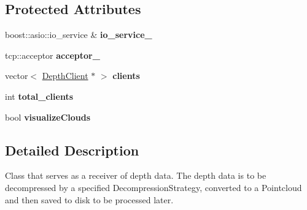 \subsection*{Protected Attributes}
\begin{DoxyCompactItemize}
\item 
\hypertarget{class_depth_server_a8f00b5c9c633649786f2fc2929856b63}{boost\+::asio\+::io\+\_\+service \& {\bfseries io\+\_\+service\+\_\+}}\label{class_depth_server_a8f00b5c9c633649786f2fc2929856b63}

\item 
\hypertarget{class_depth_server_a80279520e474ba5bb2d9db12527bcc75}{tcp\+::acceptor {\bfseries acceptor\+\_\+}}\label{class_depth_server_a80279520e474ba5bb2d9db12527bcc75}

\item 
\hypertarget{class_depth_server_a2d934c3c2eaa2f9a4b55e2c659e42375}{vector$<$ \hyperlink{class_depth_client}{Depth\+Client} $\ast$ $>$ {\bfseries clients}}\label{class_depth_server_a2d934c3c2eaa2f9a4b55e2c659e42375}

\item 
\hypertarget{class_depth_server_adf38e34741b8085f85116cc806952c63}{int {\bfseries total\+\_\+clients}}\label{class_depth_server_adf38e34741b8085f85116cc806952c63}

\item 
\hypertarget{class_depth_server_a89a9934a17453d765d8872477afa70c0}{bool {\bfseries visualize\+Clouds}}\label{class_depth_server_a89a9934a17453d765d8872477afa70c0}

\end{DoxyCompactItemize}


\subsection{Detailed Description}
Class that serves as a receiver of depth data. The depth data is to be decompressed by a specified Decompression\+Strategy, converted to a Pointcloud and then saved to disk to be processed later. 

